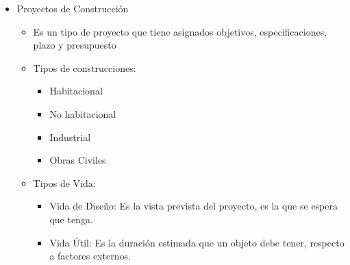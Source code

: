 \documentclass{article} %
\begin{document}
\begin{itemize}[label={},left=0pt,align=parleft]
    \item \begin{highlightbox}[levelone] Proyectos de Construcción \end{highlightbox}
    \begin{itemize}[label={},left=1em,align=parleft]
        \item \begin{highlightbox}[leveltwo] Es un tipo de proyecto que tiene asignados objetivos, especificaciones, plazo y presupuesto \end{highlightbox}
        \item \begin{highlightbox}[leveltwo] Tipos de construcciones: \end{highlightbox}
        \begin{itemize}[label={},left=2em,align=parleft]
            \item \begin{highlightbox}[levelthree] Habitacional \end{highlightbox}
            \item \begin{highlightbox}[levelthree] No habitacional \end{highlightbox}
            \item \begin{highlightbox}[levelthree] Industrial \end{highlightbox}
            \item \begin{highlightbox}[levelthree] Obras Civiles \end{highlightbox}
        \end{itemize}
        \item \begin{highlightbox}[leveltwo] Tipos de Vida: \end{highlightbox}
        \begin{itemize}[label={},left=2em,align=parleft]
            \item \begin{highlightbox}[levelthree] Vida de Diseño: Es la vista prevista del proyecto, es la que se espera que tenga. \end{highlightbox}
            \item \begin{highlightbox}[levelthree] Vida Útil: Es la duración estimada que un objeto debe tener, respecto a factores externos. \end{highlightbox}

\end{itemize}
\end{itemize}
\end{itemize}
\end{document}
